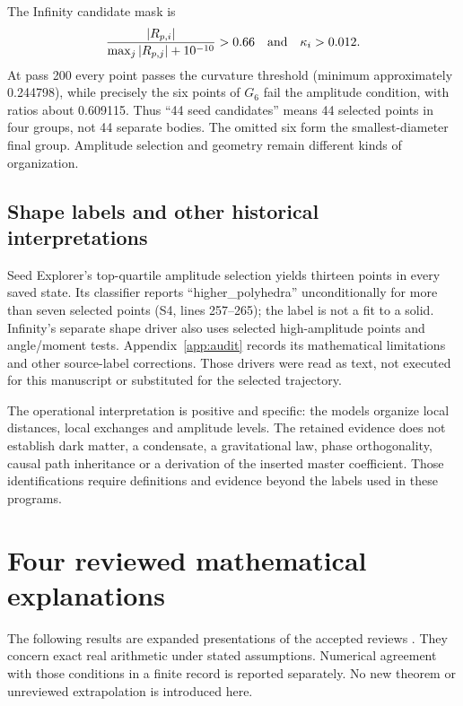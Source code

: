 \documentclass[11pt,a4paper]{article}
\newcommand{\src}[2]{\textsf{#1}, lines #2}
\begin{document}
The Infinity candidate mask is
\begin{equation}
\frac{|R_{p,i}|}{\max_j|R_{p,j}|+10^{-10}}>0.66
\quad\hbox{and}\quad \kappa_i>0.012.\label{eq:candidates}
\end{equation}
At pass 200 every point passes the curvature threshold (minimum approximately 0.244798), while precisely the six points of $G_6$ fail the amplitude condition, with ratios about 0.609115. Thus ``44 seed candidates'' means 44 selected points in four groups, not 44 separate bodies. The omitted six form the smallest-diameter final group. Amplitude selection and geometry remain different kinds of organization.

\subsection{Shape labels and other historical interpretations}
Seed Explorer's top-quartile amplitude selection yields thirteen points in every saved state. Its classifier reports ``higher\_polyhedra'' unconditionally for more than seven selected points (\src{S4}{257--265}); the label is not a fit to a solid. Infinity's separate shape driver also uses selected high-amplitude points and angle/moment tests. Appendix~\ref{app:audit} records its mathematical limitations and other source-label corrections. Those drivers were read as text, not executed for this manuscript or substituted for the selected trajectory.

The operational interpretation is positive and specific: the models organize local distances, local exchanges and amplitude levels. The retained evidence does not establish dark matter, a condensate, a gravitational law, phase orthogonality, causal path inheritance or a derivation of the inserted master coefficient. Those identifications require definitions and evidence beyond the labels used in these programs.

\section{Four reviewed mathematical explanations}
\label{sec:math}
The following results are expanded presentations of the accepted reviews \cite{review4,review5}. They concern exact real arithmetic under stated assumptions. Numerical agreement with those conditions in a finite record is reported separately. No new theorem or unreviewed extrapolation is introduced here.
\end{document}
